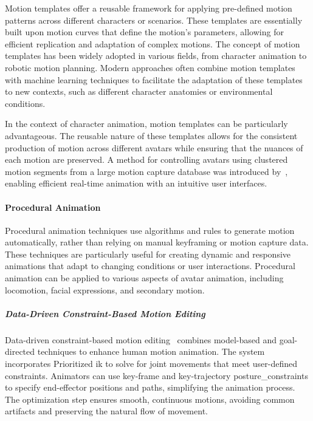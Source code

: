 \documentclass[../../main.tex]{subfiles}
\begin{document}
Motion templates offer a reusable framework for applying pre-defined motion patterns across different characters or scenarios. These templates are essentially built upon motion curves that define the motion's parameters, allowing for efficient replication and adaptation of complex motions. The concept of motion templates has been widely adopted in various fields, from character animation to robotic motion planning. Modern approaches often combine motion templates with machine learning techniques to facilitate the adaptation of these templates to new contexts, such as different character anatomies or environmental conditions.

In the context of character animation, motion templates can be particularly advantageous. The reusable nature of these templates allows for the consistent production of motion across different avatars while ensuring that the nuances of each motion are preserved. A method for controlling avatars using clustered motion segments from a large motion capture database was introduced by~\cite{10.1145/566654.566607}, enabling efficient real-time animation with an intuitive user interfaces.

\paragraph{Procedural Animation}
\label{ch:background_work:sign_language_synthesis:3d_techniques:avatar_animation:procedural_animation}

Procedural animation techniques use algorithms and rules to generate motion automatically, rather than relying on manual keyframing or motion capture data. These techniques are particularly useful for creating dynamic and responsive animations that adapt to changing conditions or user interactions. Procedural animation can be applied to various aspects of avatar animation, including locomotion, facial expressions, and secondary motion.

\subparagraph{Data-Driven Constraint-Based Motion Editing}
\label{ch:background_work:sign_language_synthesis:3d_techniques:avatar_animation:procedural_techniques:data_driven_constraint_based_motion_editing}

Data-driven constraint-based motion editing~\cite{inbook} combines model-based and goal-directed techniques to enhance human motion animation. The system incorporates Prioritized \gls{ik} to solve for joint movements that meet user-defined constraints. Animators can use key-frame and key-trajectory \gls{posture_constraint}s to specify end-effector positions and paths, simplifying the animation process. The optimization step ensures smooth, continuous motions, avoiding common artifacts and preserving the natural flow of movement.
\end{document}

